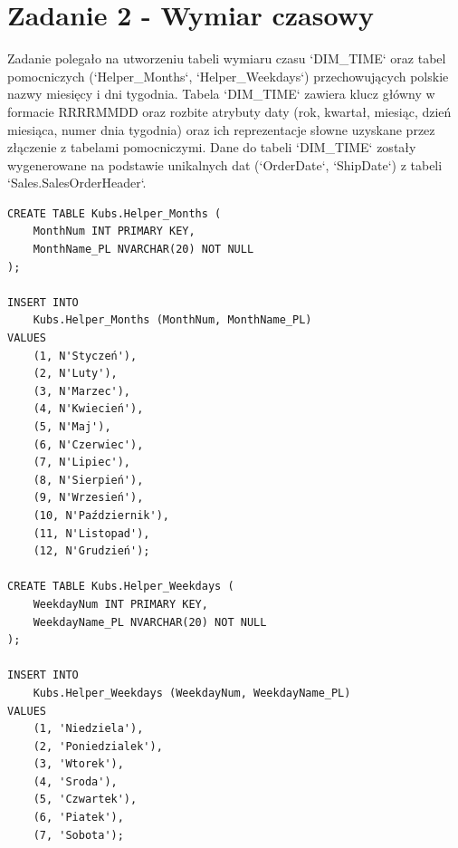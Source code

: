 \documentclass[a4paper,12pt]{article}
\begin{document}
\section{Zadanie 2 - Wymiar czasowy}

Zadanie polegało na utworzeniu tabeli wymiaru czasu `DIM\_TIME` oraz tabel pomocniczych (`Helper\_Months`, `Helper\_Weekdays`) przechowujących polskie nazwy miesięcy i dni tygodnia. Tabela `DIM\_TIME` zawiera klucz główny w formacie RRRRMMDD oraz rozbite atrybuty daty (rok, kwartał, miesiąc, dzień miesiąca, numer dnia tygodnia) oraz ich reprezentacje słowne uzyskane przez złączenie z tabelami pomocniczymi. Dane do tabeli `DIM\_TIME` zostały wygenerowane na podstawie unikalnych dat (`OrderDate`, `ShipDate`) z tabeli `Sales.SalesOrderHeader`.

\begin{lstlisting}[caption={Tworzenie tabel pomocniczych dla wymiaru czasu.}, label=lst:zad2_helpers]
CREATE TABLE Kubs.Helper_Months (
    MonthNum INT PRIMARY KEY,
    MonthName_PL NVARCHAR(20) NOT NULL
);

INSERT INTO
    Kubs.Helper_Months (MonthNum, MonthName_PL)
VALUES
    (1, N'Styczeń'),
    (2, N'Luty'),
    (3, N'Marzec'),
    (4, N'Kwiecień'),
    (5, N'Maj'),
    (6, N'Czerwiec'),
    (7, N'Lipiec'),
    (8, N'Sierpień'),
    (9, N'Wrzesień'),
    (10, N'Październik'),
    (11, N'Listopad'),
    (12, N'Grudzień');

CREATE TABLE Kubs.Helper_Weekdays (
    WeekdayNum INT PRIMARY KEY,
    WeekdayName_PL NVARCHAR(20) NOT NULL
);

INSERT INTO
    Kubs.Helper_Weekdays (WeekdayNum, WeekdayName_PL)
VALUES
    (1, 'Niedziela'),
    (2, 'Poniedzialek'),
    (3, 'Wtorek'),
    (4, 'Sroda'),
    (5, 'Czwartek'),
    (6, 'Piatek'),
    (7, 'Sobota');
\end{lstlisting}
\end{document}
